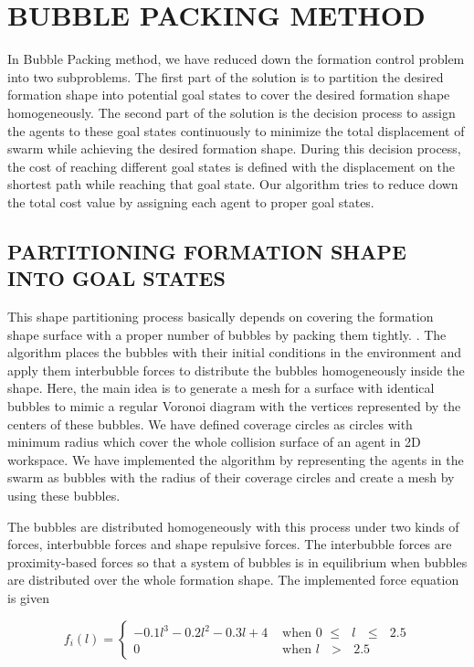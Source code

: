 \documentclass[letterpaper, 10 pt, conference]{ieeeconf}  %
\begin{document}
\section{BUBBLE PACKING METHOD}
In Bubble Packing method, we have reduced down the formation control problem into two subproblems. The first part of the solution is to partition the desired formation shape into potential goal states to cover the desired formation shape homogeneously. The second part of the solution is the decision process to assign the agents to these goal states continuously to minimize the total displacement of swarm while achieving the desired formation shape. During this decision process, the cost of reaching different goal states is defined with the displacement on the shortest path while reaching that goal state. Our algorithm tries to reduce down the total cost value by assigning each agent to proper goal states.
			
\subsection{PARTITIONING FORMATION SHAPE INTO GOAL STATES} \label{Partitioning_ref}		
This shape partitioning process basically depends on covering the formation shape surface with a proper number of bubbles by packing them tightly. \cite{27}.  The algorithm places the bubbles with their initial conditions in the environment and apply them interbubble forces to distribute the bubbles homogeneously inside the shape. Here, the main idea is to generate a mesh for a surface with identical bubbles to mimic a regular Voronoi diagram with the vertices represented by the centers of these bubbles. We have defined coverage circles as circles with minimum radius which cover the whole collision surface of an agent in 2D workspace. We have implemented the algorithm by representing the agents in the swarm as bubbles with the radius of their coverage circles and create a mesh by using these bubbles. 
			
The bubbles are distributed homogeneously with this process under two kinds of forces, interbubble forces and shape repulsive forces. The interbubble forces are proximity-based forces so that a system of bubbles is in equilibrium when bubbles are distributed over the whole formation shape. The implemented force equation is given
		
\begin{equation}
f_i(l) = \left\{ \begin{array}{rl}
-0.1l^3 - 0.2l^2 - 0.3l + 4 &\mbox{ when 0 $\leq$ $l$ $\leq$ $2.5$} \\
0                               &\mbox{ when $l$ $>$ $2.5$}
\end{array} \right.
\end{equation}
\end{document}
